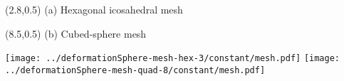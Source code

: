 \documentclass{article}
\begin{document}
\TPMargin{2pt}
\begin{textblock}{5}(2.8,0.5)
\normalsize
(a) Hexagonal icosahedral mesh
\end{textblock}
\begin{textblock}{4}(8.5,0.5)
\normalsize
(b) Cubed-sphere mesh
\end{textblock}
\centering
\vspace*{1em}
\texttt{[image: ../deformationSphere-mesh-hex-3/constant/mesh.pdf]}
\hspace*{2em}
\texttt{[image: ../deformationSphere-mesh-quad-8/constant/mesh.pdf]}
\end{document}
